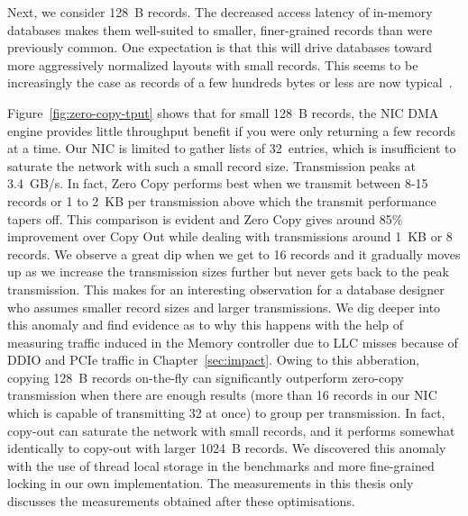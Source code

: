 Next, we consider 128~B records. The decreased access latency of
in-memory databases makes them well-suited to smaller, finer-grained records
than were previously common. One expectation is that this will drive databases
toward more aggressively normalized layouts with small records. This
seems to be increasingly the case as records of a few hundreds bytes or less
are now typical~\cite{fb-memcache,fb-workload}.


Figure~\ref{fig:zero-copy-tput} shows that for small 128~B records, the NIC DMA
engine provides little throughput benefit if you were only returning a few records 
at a time. Our NIC is limited to gather lists
of 32~entries, which is insufficient to saturate the network with such a small
record size. Transmission peaks at 3.4~GB/s. In fact, Zero Copy performs best when
we transmit between 8-15 records or 1 to 2~KB per transmission above which the transmit performance 
tapers off. This comparison is evident and Zero Copy gives around 85\% improvement over Copy Out while dealing 
with transmissions around 1~KB or 8 records. We observe a great dip when we get to 16 records and it gradually moves up as we 
increase the transmission sizes further but never gets back to the peak transmission. This makes 
for an interesting observation for a database designer who assumes smaller record sizes and larger 
transmissions. We dig deeper into this anomaly and find evidence as to why this happens with the 
help of measuring traffic induced in the Memory controller due to LLC misses because of DDIO and 
PCIe traffic in Chapter~\ref{sec:impact}. Owing to this abberation, copying 128~B records 
on-the-fly can significantly outperform zero-copy transmission when there are 
enough results (more than 16 records in our NIC which is capable of transmitting 32 at once) to group per transmission.
In fact, copy-out can saturate the network with small records, and it
performs somewhat identically to copy-out with larger 1024~B records. We discovered this anomaly 
with the use of thread local storage in the benchmarks and more fine-grained locking 
in our own implementation. The measurements in this thesis only discusses the 
measurements obtained after these optimisations.


